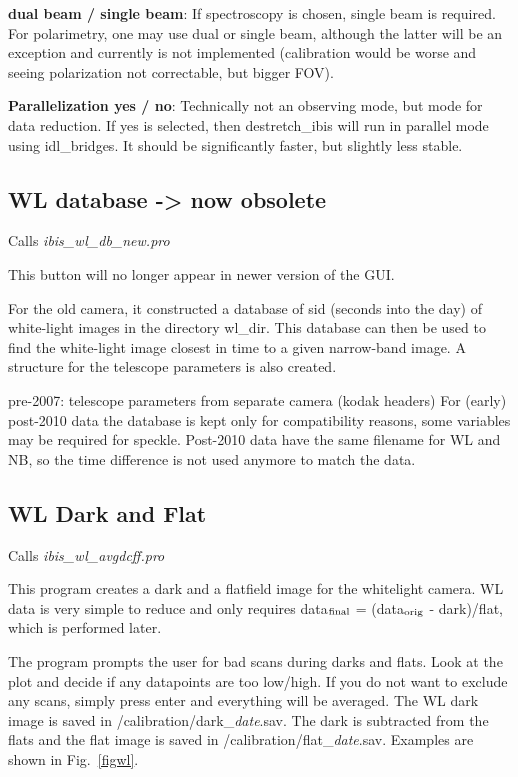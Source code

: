 \documentclass[a4paper,11pt]{article}
\begin{document}
\textbf{dual beam / single beam}: If spectroscopy is chosen, single beam is required. For polarimetry, one may use dual or single beam, although the latter will be an exception and currently is not implemented (calibration would be worse and seeing polarization not correctable, but bigger FOV).

\textbf{Parallelization yes / no}: Technically not an observing mode, but mode for data reduction. If yes is selected, then destretch\_ibis will run in parallel mode using idl\_bridges. It should be significantly faster, but slightly less stable.

\subsection{WL database -> now obsolete}
Calls \textit{ibis\_wl\_db\_new.pro}

This button will no longer appear in newer version of the GUI.

For the old camera, it constructed a database of sid (seconds into the day) of white-light
images in the directory wl\_dir. This database can then be used
to find the white-light image closest in time to a given narrow-band
image. A structure for the telescope parameters is also created.

pre-2007: telescope parameters from separate camera (kodak headers)
For (early) post-2010 data the database is kept only for compatibility reasons, some variables may be required for speckle. Post-2010 data have the same filename for WL and NB, so the time difference is not used anymore to match the data.

\subsection{WL Dark and Flat}
Calls \textit{ibis\_wl\_avgdcff.pro}

This program creates a dark and a flatfield image for the whitelight camera. WL data is very simple to reduce and only requires data$_{\rm final}$ = (data$_{\rm orig}$ - dark)/flat, which is performed later.

The program prompts the user for bad scans during darks and flats. Look at the
plot and decide if any datapoints are too low/high. If you do not want
to exclude any scans, simply press enter and everything will be averaged. The WL dark image is saved in /calibration/dark\_\textit{date}.sav. The dark is subtracted from the flats and the flat image is saved in /calibration/flat\_\textit{date}.sav. Examples are shown in Fig.~\ref{figwl}.
\end{document}

